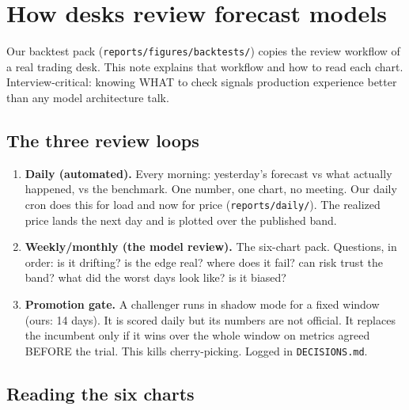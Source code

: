 \section{How desks review forecast models}

Our backtest pack (\texttt{reports/figures/backtests/}) copies the review
workflow of a real trading desk. This note explains that workflow and how
to read each chart. Interview-critical: knowing WHAT to check signals
production experience better than any model architecture talk.

\subsection{The three review loops}

\begin{enumerate}
  \item \textbf{Daily (automated).} Every morning: yesterday's forecast
        vs what actually happened, vs the benchmark. One number, one
        chart, no meeting. Our daily cron does this for load and now for
        price (\texttt{reports/daily/}). The realized price lands the next
        day and is plotted over the published band.
  \item \textbf{Weekly/monthly (the model review).} The six-chart pack.
        Questions, in order: is it drifting? is the edge real? where does
        it fail? can risk trust the band? what did the worst days look
        like? is it biased?
  \item \textbf{Promotion gate.} A challenger runs in shadow mode for a
        fixed window (ours: 14 days). It is scored daily but its numbers
        are not official. It replaces the incumbent only if it wins over
        the whole window on metrics agreed BEFORE the trial. This kills
        cherry-picking. Logged in \texttt{DECISIONS.md}.
\end{enumerate}

\subsection{Reading the six charts}

